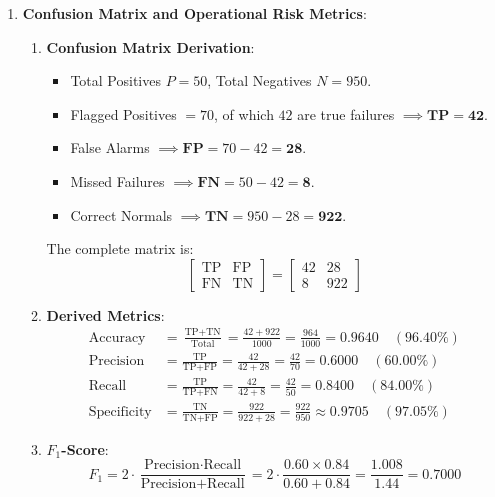 \begin{enumerate}
    \item \textbf{Confusion Matrix and Operational Risk Metrics}:
    \begin{enumerate}[label=(\alph*)]
        \item \textbf{Confusion Matrix Derivation}:
        \begin{itemize}
            \item Total Positives $P = 50$, Total Negatives $N = 950$.
            \item Flagged Positives $= 70$, of which $42$ are true failures $\implies \mathbf{\text{TP} = 42}$.
            \item False Alarms $\implies \mathbf{\text{FP}} = 70 - 42 = \mathbf{28}$.
            \item Missed Failures $\implies \mathbf{\text{FN}} = 50 - 42 = \mathbf{8}$.
            \item Correct Normals $\implies \mathbf{\text{TN}} = 950 - 28 = \mathbf{922}$.
        \end{itemize}
        The complete matrix is:
        \begin{equation*}
        \begin{bmatrix} \text{TP} & \text{FP} \\ \text{FN} & \text{TN} \end{bmatrix} = \begin{bmatrix} 42 & 28 \\ 8 & 922 \end{bmatrix}
        \end{equation*}

        \item \textbf{Derived Metrics}:
        \begin{align*}
        \text{Accuracy} &= \frac{\text{TP} + \text{TN}}{\text{Total}} = \frac{42 + 922}{1000} = \frac{964}{1000} = \mathbf{0.9640} \quad (96.40\%) \\
        \text{Precision} &= \frac{\text{TP}}{\text{TP} + \text{FP}} = \frac{42}{42 + 28} = \frac{42}{70} = \mathbf{0.6000} \quad (60.00\%) \\
        \text{Recall} &= \frac{\text{TP}}{\text{TP} + \text{FN}} = \frac{42}{42 + 8} = \frac{42}{50} = \mathbf{0.8400} \quad (84.00\%) \\
        \text{Specificity} &= \frac{\text{TN}}{\text{TN} + \text{FP}} = \frac{922}{922 + 28} = \frac{922}{950} \approx \mathbf{0.9705} \quad (97.05\%)
        \end{align*}

        \item \textbf{$F_1$-Score}:
        \begin{equation*}
        F_1 = 2 \cdot \frac{\text{Precision} \cdot \text{Recall}}{\text{Precision} + \text{Recall}} = 2 \cdot \frac{0.60 \times 0.84}{0.60 + 0.84} = \frac{1.008}{1.44} = \mathbf{0.7000}
        \end{equation*}


\end{enumerate}
\end{enumerate}
